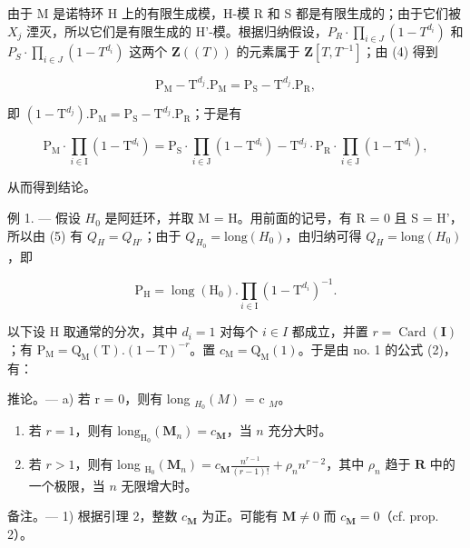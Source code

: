 由于 M 是诺特环 H 上的有限生成模，H-模 R 和 S 都是有限生成的；由于它们被 \(X_{j}\) 湮灭，所以它们是有限生成的 H'-模。根据归纳假设，\(P_{R}\cdot\prod_{i\in J}(1-T^{d_{i}})\) 和 \(P_{S}\cdot\prod_{i\in J}(1-T^{d_{i}})\) 这两个 \(\mathbf{Z}((T))\) 的元素属于 \(\mathbf{Z}[T,T^{-1}]\)；由 (4) 得到

\[
\mathrm{P} _ {\mathrm{M}} - \mathrm{T} ^ {d _ {j}}. \mathrm{P} _ {\mathrm{M}} = \mathrm{P} _ {\mathrm{S}} - \mathrm{T} ^ {d _ {j}}. \mathrm{P} _ {\mathrm{R}},
\]

即 \((1 - \mathrm{T}^{d_j}).\mathrm{P}_{\mathrm{M}} = \mathrm{P}_{\mathrm{S}} - \mathrm{T}^{d_j}.\mathrm{P}_{\mathrm{R}}\)；于是有

\[
\mathrm{P} _ {\mathrm{M}} \cdot \prod_ {i \in \mathrm{I}} (1 - \mathrm{T} ^ {d _ {i}}) = \mathrm{P} _ {\mathrm{S}} \cdot \prod_ {i \in \mathrm{J}} (1 - \mathrm{T} ^ {d _ {i}}) - \mathrm{T} ^ {d _ {j}} \cdot \mathrm{P} _ {\mathrm{R}} \cdot \prod_ {i \in \mathrm{J}} (1 - \mathrm{T} ^ {d _ {i}}),\tag{5}
\]

从而得到结论。

例 1. --- 假设 \(H_{0}\) 是阿廷环，并取 M = H。用前面的记号，有 R = 0 且 S = H'，所以由 (5) 有 \(Q_{H} = Q_{H'}\)；由于 \(Q_{H_{0}} = \text{long}(H_{0})\)，由归纳可得 \(Q_{H} = \text{long}(H_{0})\)，即

\[
\mathrm{P} _ {\mathrm{H}} = \operatorname{long} (\mathrm{H} _ {0}). \prod_ {i \in \mathrm{I}} (1 - \mathrm{T} ^ {d _ {i}}) ^ {- 1}.\tag{6}
\]

以下设 H 取通常的分次，其中 \(d_{i}=1\) 对每个 \(i\in I\) 都成立，并置 \(r=\operatorname{Card}(\mathbf{I})\)；有 \(\mathrm{P}_{\mathrm{M}}=\mathrm{Q}_{\mathrm{M}}(\mathrm{T}).(1-\mathrm{T})^{-r}\)。置 \(c_{\mathrm{M}}=\mathrm{Q}_{\mathrm{M}}(1)\)。于是由 no. 1 的公式 (2)，有：

推论。--- a) 若 r = 0，则有 long \(_{H_{0}}(M)\) = c \(_{M}\)。

\begin{enumerate}
\def\labelenumi{\alph{enumi})}
\setcounter{enumi}{1}
\item
  若 \(r = 1\)，则有 \(\mathrm{long}_{\mathrm{H}_0}(\mathbf{M}_n) = c_{\mathbf{M}}\)，当 \(n\) 充分大时。
\item
  若 \(r > 1\)，则有 long \(_{\mathrm{H}_0}(\mathbf{M}_n) = c_{\mathbf{M}} \frac{n^{r-1}}{(r - 1)!} + \rho_n n^{r-2}\)，其中 \(\rho_n\) 趋于 \(\mathbf{R}\) 中的一个极限，当 \(n\) 无限增大时。
\end{enumerate}

备注。--- 1) 根据引理 2，整数 \(c_{\mathbf{M}}\) 为正。可能有 \(\mathbf{M} \neq 0\) 而 \(c_{\mathbf{M}} = 0\)（cf. prop. 2）。

